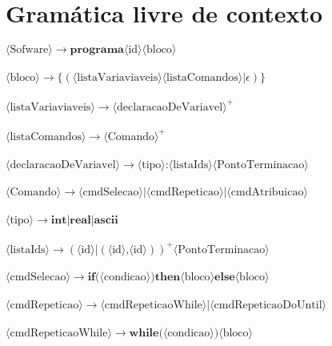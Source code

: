 \documentclass[11pt]{article}
\begin{document}
\section{Gramática livre de contexto}

$\langle \text{Sofware} \rangle \rightarrow \textbf{programa} \langle\text{id}\rangle \langle\text{bloco}\rangle$\\\\
$\langle\text{bloco}\rangle \rightarrow \textbf{\{} (\langle\text{listaVariaviaveis}\rangle \langle\text{listaComandos}\rangle | \epsilon) \textbf{\}}$\\\\
$\langle\text{listaVariaviaveis}\rangle \rightarrow \langle\text{declaracaoDeVariavel}\rangle^{+}$\\\\
$\langle\text{listaComandos}\rangle \rightarrow \langle\text{Comando}\rangle^{+}$\\\\
$\langle\text{declaracaoDeVariavel}\rangle  \rightarrow \langle\text{tipo}\rangle \textbf{:} \langle\text{listaIds}\rangle \langle\text{PontoTerminacao}\rangle$\\\\
$\langle\text{Comando}\rangle \rightarrow \langle\text{cmdSelecao}\rangle|\langle\text{cmdRepeticao}\rangle|\langle\text{cmdAtribuicao}\rangle$\\\\
$\langle\text{tipo}\rangle  \rightarrow \textbf{int} | \textbf{real} | \textbf{ascii} $\\\\
$\langle\text{listaIds}\rangle \rightarrow (\langle\text{id}\rangle | (\langle\text{id}\rangle\textbf{,}\langle\text{id}\rangle))^{+} \langle\text{PontoTerminacao}\rangle$\\\\
$\langle\text{cmdSelecao}\rangle \rightarrow \textbf{if(} \langle\text{condicao}\rangle \textbf{)then} \langle\text{bloco}\rangle \textbf{else} \langle\text{bloco}\rangle  $\\\\
$\langle\text{cmdRepeticao}\rangle \rightarrow \langle\text{cmdRepeticaoWhile}\rangle|\langle\text{cmdRepeticaoDoUntil}\rangle$\\\\
$\langle\text{cmdRepeticaoWhile}\rangle \rightarrow \textbf{while(} \langle\text{condicao}\rangle \textbf{)} \langle\text{bloco}\rangle $\\\\
\end{document}
